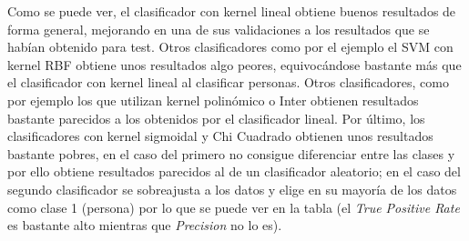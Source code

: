 Como se puede ver, el clasificador con kernel lineal obtiene buenos resultados de forma general, mejorando en una de sus validaciones a los resultados que se habían obtenido para test. Otros clasificadores como por el ejemplo el SVM con kernel RBF obtiene unos resultados algo peores, equivocándose bastante más que el clasificador con kernel lineal al clasificar personas. Otros clasificadores, como por ejemplo los que utilizan kernel polinómico o Inter obtienen resultados bastante parecidos a los obtenidos por el clasificador lineal. Por último, los clasificadores con kernel sigmoidal y Chi Cuadrado obtienen unos resultados bastante pobres, en el caso del primero no consigue diferenciar entre las clases y por ello obtiene resultados parecidos al de un clasificador aleatorio; en el caso del segundo clasificador se sobreajusta a los datos y elige en su mayoría de los datos como clase 1 (persona) por lo que se puede ver en la tabla (el \textit{True Positive Rate} es bastante alto mientras que \textit{Precision} no lo es).